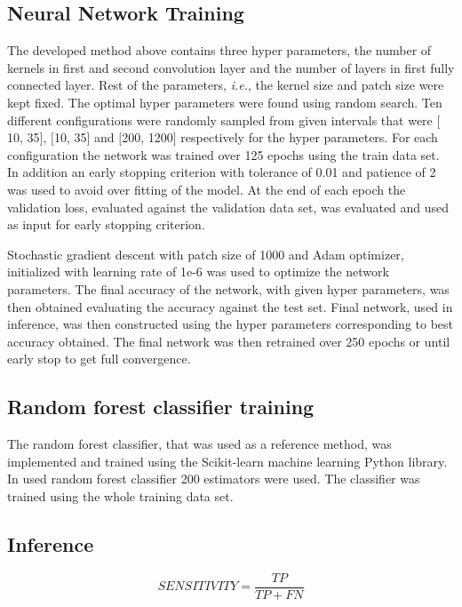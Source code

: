 \documentclass[aps,prb,10pt,twocolumn,groupedaddress]{revtex4-1}
\begin{document}
\subsection{Neural Network Training}
\label{sec:computational_methods_training_neural_network}
The developed method above contains three hyper parameters, the number of kernels in first and second convolution layer and the number of layers in first fully connected layer. Rest of the parameters, \textit{i.e.}, the kernel size and patch size were kept fixed. The optimal hyper parameters were found using random search. Ten different configurations were randomly sampled from given intervals that were $\lbrack$10, 35$\rbrack$, $\lbrack$10, 35$\rbrack$ and $\lbrack$200, 1200$\rbrack$ respectively for the hyper parameters. For each configuration the network was trained over 125 epochs using the train data set. In addition an early stopping criterion with tolerance of 0.01 and patience of 2 was used to avoid over fitting of the model. At the end of each epoch the validation loss, evaluated against the validation data set, was evaluated and used as input for early stopping criterion.

Stochastic gradient descent with patch size of 1000 and Adam optimizer\cite{adam}, initialized with learning rate of 1e-6 was used to optimize the network parameters. The final accuracy of the network, with given hyper parameters, was then obtained evaluating the accuracy against the test set. Final network, used in inference, was then constructed using the hyper parameters corresponding to best accuracy obtained. The final network was then retrained over 250 epochs or until early stop to get full convergence.

\subsection{Random forest classifier training}
\label{sec:computational_methods_training_random_forest}
The random forest classifier, that was used as a reference method, was implemented and trained using the Scikit-learn machine learning Python library. In used random forest classifier 200 estimators were used. The classifier was trained using the whole training data set.

\subsection{Inference}
\label{sec:computational_methods_inference}
\begin{equation}
	SENSITIVITY = \frac{TP}{TP + FN}
	\label{eq:sensitivity}
\end{equation}
\end{document}
